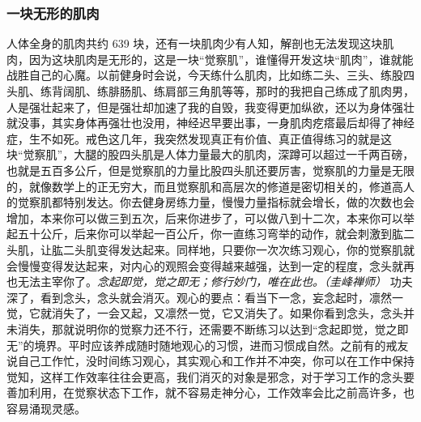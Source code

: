 \subsubsection{一块无形的肌肉}

人体全身的肌肉共约 639 块，还有一块肌肉少有人知，解剖也无法发现这块肌肉，因为这块肌肉是无形的，这是一块“觉察肌”，谁懂得开发这块“肌肉”，谁就能战胜自己的心魔。以前健身时会说，今天练什么肌肉，比如练二头、三头、练股四头肌、练背阔肌、练腓肠肌、练肩部三角肌等等，那时的我把自己练成了肌肉男，人是强壮起来了，但是强壮却加速了我的自毁，我变得更加纵欲，还以为身体强壮就没事，其实身体再强壮也没用，神经迟早要出事，一身肌肉疙瘩最后却得了神经症，生不如死。戒色这几年，我突然发现真正有价值、真正值得练习的就是这块“觉察肌”，大腿的股四头肌是人体力量最大的肌肉，深蹲可以超过一千两百磅，也就是五百多公斤，但是觉察肌的力量比股四头肌还要厉害，觉察肌的力量是无限的，就像数学上的正无穷大，而且觉察肌和高层次的修道是密切相关的，修道高人的觉察肌都特别发达。你去健身房练力量，慢慢力量指标就会增长，做的次数也会增加，本来你可以做三到五次，后来你进步了，可以做八到十二次，本来你可以举起五十公斤，后来你可以举起一百公斤，你一直练习弯举的动作，就会刺激到肱二头肌，让肱二头肌变得发达起来。同样地，只要你一次次练习观心，你的觉察肌就会慢慢变得发达起来，对内心的观照会变得越来越强，达到一定的程度，念头就再也无法主宰你了。\textit{念起即觉，觉之即无；修行妙门，唯在此也。（圭峰禅师）} 功夫深了，看到念头，念头就会消灭。观心的要点：看当下一念，妄念起时，凛然一觉，它就消失了，一会又起，又凛然一觉，它又消失了。如果你看到念头，念头并未消失，那就说明你的觉察力还不行，还需要不断练习以达到“念起即觉，觉之即无”的境界。平时应该养成随时随地观心的习惯，进而习惯成自然。之前有的戒友说自己工作忙，没时间练习观心，其实观心和工作并不冲突，你可以在工作中保持觉知，这样工作效率往往会更高，我们消灭的对象是邪念，对于学习工作的念头要善加利用，在觉察状态下工作，就不容易走神分心，工作效率会比之前高许多，也容易涌现灵感。

